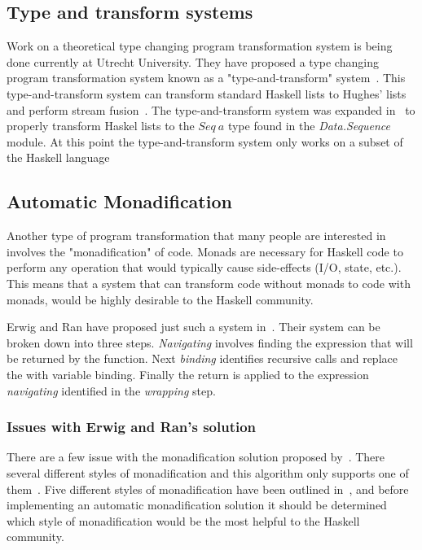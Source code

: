 \subsection{Type and transform systems}

Work on a theoretical type changing program transformation system is being done currently at Utrecht University. They have proposed a type changing program transformation system known as a "type-and-transform" system~\citep{typeAndTransform}. This type-and-transform system can transform standard Haskell lists to Hughes' lists and perform stream fusion~\citep{typeAndTransform}. The type-and-transform system was expanded in~\citep{typeAndTransformPatterns} to properly transform Haskel lists to the $Seq~a$ type found in the \textit{Data.Sequence} module. At this point the type-and-transform system only works on a subset of the Haskell language~\citep{typeAndTransform}

\subsection{Automatic Monadification}\label{erwigMonad}

Another type of program transformation that many people are interested in involves the "monadification" of code. Monads are necessary for Haskell code to perform any operation that would typically cause side-effects (I/O, state, etc.). This means that a system that can transform code without monads to code with monads, would be highly desirable to the Haskell community.

Erwig and Ran have proposed just such a system in~\citep{monadification}. Their system can be broken down into three steps. \textit{Navigating} involves finding the expression that will be returned by the function. Next \textit{binding} identifies recursive calls and replace the with variable binding. Finally the return is applied to the expression \textit{navigating} identified in the \textit{wrapping} step.

\subsubsection{Issues with Erwig and Ran's solution}

There are a few issue with the monadification solution proposed by~\citep{monadification}. There several different styles of monadification and this algorithm only supports one of them~\citep{clausMonadResponse}. Five different styles of monadification have been outlined in~\citep{monadSurvey}, and before implementing an automatic monadification solution it should be determined which style of monadification would be the most helpful to the Haskell community.

